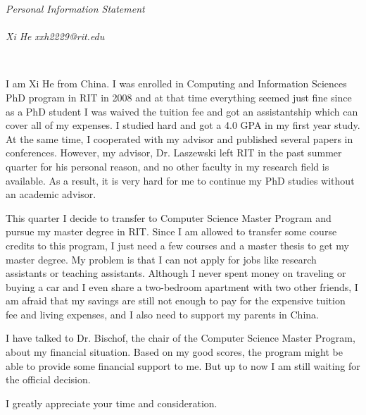 \documentclass[12pt]{article}
\def\footerlink{}
\begin{document}
\begin{center}
{\large {\em Personal Information Statement}}\\
~\\ 
{\small{\em Xi He }}
{\small{\em xxh2229@rit.edu}}
\end{center}
~\\
\begin{spacing}{1.5}
I am Xi He from China. I was enrolled in Computing and Information Sciences PhD program in RIT in 2008 and at that time everything seemed just fine since as a PhD student I was waived the tuition fee and got an assistantship which can cover all of my expenses. I studied hard and got a 4.0 GPA in my first year study. At the same time, I cooperated with my advisor and published several papers in conferences. However, my advisor, Dr. Laszewski left RIT in the past summer quarter for his personal reason, and no other faculty in my research field is available. As a result, it is very hard for me to continue my PhD studies without an academic advisor.

This quarter I decide to transfer to Computer Science Master Program and pursue my master degree in RIT. Since I am allowed to transfer some course credits to this program, I just need a few courses and a master thesis to get my master degree. My problem is that I can not apply for jobs like research assistants or teaching assistants. Although I never spent money on traveling or buying a car and I even share a two-bedroom apartment with two other friends, I am afraid that my savings are still not enough to pay for the expensive tuition fee and living expenses, and I also need to support my parents in China. 
 
I have talked to Dr. Bischof, the chair of the Computer Science Master Program, about my financial situation. Based on my good scores, the program might be able to provide some financial support to me. But up to now I am still waiting for the official decision.

I greatly appreciate your time and consideration. 

\end{spacing}

\end{document}

